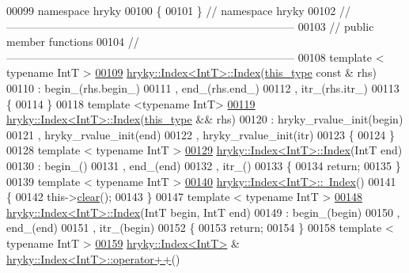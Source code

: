 \begin{DoxyCode}
00099 \textcolor{keyword}{namespace }hryky
00100 \{
00101 \} \textcolor{comment}{// namespace hryky}
00102 \textcolor{comment}{//
      ------------------------------------------------------------------------------}
00103 \textcolor{comment}{// public member functions}
00104 \textcolor{comment}{//
      ------------------------------------------------------------------------------}
00108 \textcolor{comment}{}\textcolor{keyword}{template} < \textcolor{keyword}{typename} IntT >
\hypertarget{index_8h_source_l00109}{}\hyperlink{classhryky_1_1_index_a14c8de3e4620e853f3eb8baf8784cad9}{00109} \hyperlink{classhryky_1_1_index}{hryky::Index<IntT>::Index}(\hyperlink{classhryky_1_1_index}{this_type} \textcolor{keyword}{const} & rhs)
00110     : begin\_(rhs.begin\_)
00111       , end\_(rhs.end\_)
00112       , itr\_(rhs.itr\_)
00113 \{
00114 \}
00118 \textcolor{keyword}{template} <\textcolor{keyword}{typename} IntT>
\hypertarget{index_8h_source_l00119}{}\hyperlink{classhryky_1_1_index_a0c610735923728d429b50ce671f63230}{00119} \hyperlink{classhryky_1_1_index}{hryky::Index<IntT>::Index}(\hyperlink{classhryky_1_1_index}{this_type} && rhs)
00120     : hryky\_rvalue\_init(begin)
00121       , hryky\_rvalue\_init(end)
00122       , hryky\_rvalue\_init(itr)
00123 \{
00124 \}
00128 \textcolor{keyword}{template} < \textcolor{keyword}{typename} IntT >
\hypertarget{index_8h_source_l00129}{}\hyperlink{classhryky_1_1_index_ab2e10bac17b87fd63a7f6ab41a208770}{00129} \hyperlink{classhryky_1_1_index}{hryky::Index<IntT>::Index}(IntT end)
00130     : begin\_()
00131       , end\_(end)
00132       , itr\_()
00133 \{
00134     \textcolor{keywordflow}{return};
00135 \}
00139 \textcolor{keyword}{template} < \textcolor{keyword}{typename} IntT >
\hypertarget{index_8h_source_l00140}{}\hyperlink{classhryky_1_1_index_a1d2c73081a69849088ff400bc472cc44}{00140} \hyperlink{classhryky_1_1_index}{hryky::Index<IntT>::~Index}()
00141 \{
00142     this->\hyperlink{namespacehryky_aa201297ea9530da954a7230be71cc19d}{clear}();
00143 \}
00147 \textcolor{keyword}{template} < \textcolor{keyword}{typename} IntT >
\hypertarget{index_8h_source_l00148}{}\hyperlink{classhryky_1_1_index_a0a22e9168d9f8ce09b5f33136711132a}{00148} \hyperlink{classhryky_1_1_index}{hryky::Index<IntT>::Index}(IntT begin, IntT end)
00149     : begin\_(begin)
00150       , end\_(end)
00151       , itr\_(begin)
00152 \{
00153     \textcolor{keywordflow}{return};
00154 \}
00158 \textcolor{keyword}{template} < \textcolor{keyword}{typename} IntT >
\hypertarget{index_8h_source_l00159}{}\hyperlink{classhryky_1_1_index_a73d0be6fb5048f33b51514dc481c0de3}{00159} \hyperlink{classhryky_1_1_index}{hryky::Index<IntT>} & \hyperlink{classhryky_1_1_index}{hryky::Index<IntT>::operator++}()

\end{DoxyCode}
